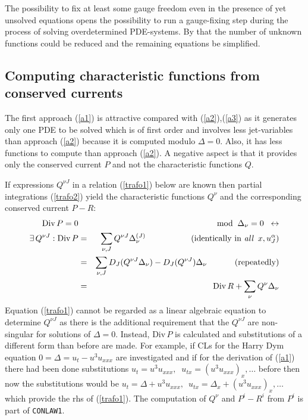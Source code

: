 The possibility to fix at least some gauge freedom even in the 
presence of yet unsolved equations opens the possibility to
run a gauge-fixing step during the process of solving
overdetermined PDE-systems. By that the number of unknown 
functions could be reduced and the remaining equations be simplified.

\subsection{Computing characteristic functions from \\ conserved currents}
The first approach (\ref{a1}) is attractive compared with (\ref{a2}),(\ref{a3})
as it generates only one PDE to be solved which is of first
order and involves less jet-variables than approach (\ref{a2})
because it is computed modulo $\Delta = 0$. Also, it has less functions
to compute than approach (\ref{a2}). A negative aspect is that
it provides only the conserved current $P$ and not the characteristic
functions $Q$. 

If expressions $Q^{\nu J}$ in a relation (\ref{trafo1}) below are known
then partial integrations (\ref{trafo2})
yield the characteristic functions $Q^{\nu}$
and the corresponding conserved current $P-R$:
\begin{eqnarray}
\mbox{Div}\,P = 0 & &\!\!\!\!\!\!\!\mbox{mod}\;\;\Delta_{\nu}=0 \;\;
\leftrightarrow \nonumber \\
\exists\, Q^{\nu J}: \mbox{Div}\,P & = & \sum_{\nu,J} Q^{\nu J}
\Delta_{\nu}^{(J)} \;\;\;\;\;\;\;\;\;\;\;\;\;\;\;\;\;\;\;\,
(\mbox{identically in {\it all}} \;\; x, u^{\alpha}_J ) \label{trafo1} \\
& = & \sum_{\nu,J} D_J(Q^{\nu J} \Delta_{\nu}) - D_J(Q^{\nu J}) \Delta_{\nu}
\;\;\;\;\;\;\;\;\;\;\;\;(\mbox{repeatedly}) \label{trafo2}   \\
& = & \mbox{Div}\,R + \sum_{\nu} Q^{\nu} \Delta_{\nu}  \nonumber 
\end{eqnarray}
Equation (\ref{trafo1}) cannot be regarded as a linear algebraic
equation to determine $Q^{\nu J}$ as
there is the additional requirement that the $Q^{\nu J}$ are non-singular
for solutions of $\Delta=0$. Instead,
$\mbox{Div}\,P$ is calculated 
and substitutions of a different form than before
are made. For example, if CLs for the Harry Dym equation 
$0 = \Delta = u_{t} - u^3u_{xxx}$ are investigated and if for the
derivation of (\ref{a1}) there had been done substitutions
$u_{t}=u^3u_{xxx},\;\; u_{tx}=(u^3u_{xxx})_{x},\ldots$ before
then now the substitutions would be
$u_{t}=\Delta+u^3u_{xxx},\,$ 
$u_{tx}=\Delta_{x}+(u^3u_{xxx})_{x},\ldots$
which provide the rhs of (\ref{trafo1}).
The computation of $Q^{\nu}$ and $P^i-R^i$ from $P^i$ is part of {\tt CONLAW1}.

